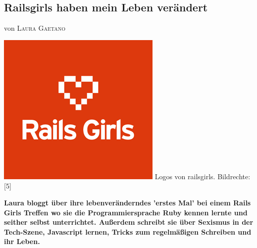 \documentclass[10pt,a4paper,ngerman,twoside]{article} %
\newcommand{\NewsItem}[1]{ %
\usefont{T1}{fvs}{n}{n} %
\vspace{24pt}\large #1\vspace{3pt} %
\par \normalsize \normalfont}
\newcommand{\NewsAuthor}[1]{ %
\hfill von \textsc{#1} \vspace{20pt} %
\par \normalfont}
\begin{document}
\begin{multicols}{3}
\NewsItem{}
\section*{Railsgirls haben mein Leben verändert}
\label{laura}
\NewsAuthor{Laura Gaetano}

\begin{center}
\includegraphics[width=\linewidth]{laura/laura-railsgirls.png}
\footnotesize{Logos von railsgirls. Bildrechte: [5]}
\end{center}

\textbf{Laura bloggt über ihre lebenveränderndes 'erstes Mal' bei einem Rails Girls Treffen wo sie die Programmiersprache Ruby kennen lernte und seither selbst unterrichtet. Außerdem schreibt sie über Sexismus in der Tech-Szene, Javascript lernen, Tricks zum regelmäßigen Schreiben und ihr Leben.} \\


\end{multicols}
\end{document}
